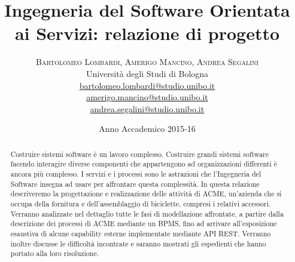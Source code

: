 \documentclass[twoside]{article}
\title{\vspace{-15mm}\fontsize{24pt}{10pt}\selectfont\textbf{Ingegneria del Software Orientata ai Servizi: relazione di progetto}} %
\author{
\large
\textsc{Bartolomeo Lombardi, Amerigo Mancino, Andrea Segalini}\\[2mm] %
\normalsize Università degli Studi di Bologna %
\vspace{5mm} \\
\normalsize \href{mailto:bartolomeo.lombardi@studio.unibo.it}{bartolomeo.lombardi@studio.unibo.it}\\
\normalsize \href{mailto:amerigo.mancino@studio.unibo.it}{amerigo.mancino@studio.unibo.it}\\
\normalsize \href{mailto:andrea.segalini@studio.unibo.it}{andrea.segalini@studio.unibo.it}
\vspace{-5mm}
}
\date{Anno Accademico 2015-16}
\begin{document}
\maketitle 


\begin{abstract}
\noindent
Costruire sistemi software è un lavoro complesso. Costruire grandi sistemi software facendo interagire
diverse componenti che appartengono ad organizzazioni differenti è ancora più complesso. I servizi e i
processi sono le astrazioni che l'Ingegneria del Software insegna ad usare per affrontare questa
complessità.
In questa relazione descriveremo la progettazione e realizzazione delle attività di ACME, un'azienda
che si occupa della fornitura e dell'assemblaggio di biciclette, compresi i relativi accessori. Verranno
analizzate nel dettaglio tutte le fasi di modellazione affrontate, a partire dalla descrizione
dei processi di ACME mediante un BPMS, fino ad arrivare all'esposizione esaustiva di alcune capability
esterne implementate mediante API REST. Verranno inoltre discusse le difficoltà incontrate e saranno
mostrati gli espedienti che hanno portato alla loro risoluzione.
\end{abstract}


\vspace{15mm} %
\end{document}
